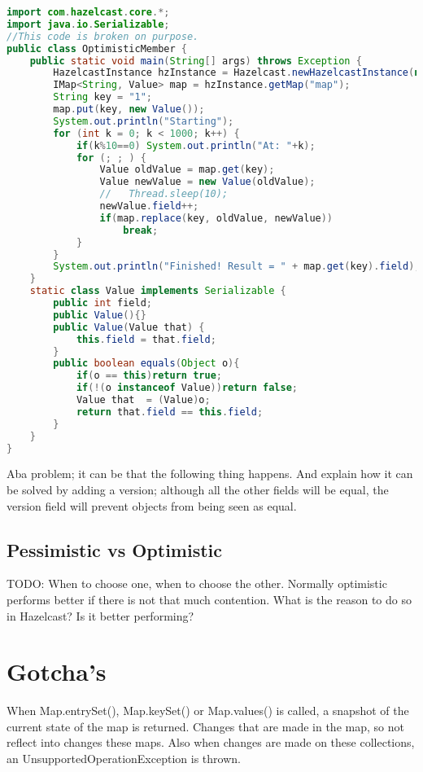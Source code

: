 \begin{lstlisting}[language=java]
import com.hazelcast.core.*;
import java.io.Serializable;
//This code is broken on purpose.
public class OptimisticMember {
    public static void main(String[] args) throws Exception {
        HazelcastInstance hzInstance = Hazelcast.newHazelcastInstance(null);
        IMap<String, Value> map = hzInstance.getMap("map");
        String key = "1";
        map.put(key, new Value());
        System.out.println("Starting");
        for (int k = 0; k < 1000; k++) {
            if(k%10==0) System.out.println("At: "+k);
            for (; ; ) {
                Value oldValue = map.get(key);
                Value newValue = new Value(oldValue);
                //   Thread.sleep(10);
                newValue.field++;
                if(map.replace(key, oldValue, newValue))
                    break;
            }
        }
        System.out.println("Finished! Result = " + map.get(key).field);
    }
    static class Value implements Serializable {
        public int field;
        public Value(){}
        public Value(Value that) {
            this.field = that.field;
        }
        public boolean equals(Object o){
            if(o == this)return true;
            if(!(o instanceof Value))return false;
            Value that  = (Value)o;
            return that.field == this.field;
        }
    }
}
\end{lstlisting}
Aba problem; it can be that the following thing happens. And explain how it can be solved by adding a version; although all the other fields will be equal, the version field will prevent objects from being seen as equal.

\subsection{Pessimistic vs Optimistic}
TODO: When to choose one, when to choose the other. Normally optimistic performs better if there is not that much contention. What is the reason to do so in Hazelcast? Is it better performing?

\section{Gotcha's}
When Map.entrySet(), Map.keySet() or Map.values() is called, a snapshot of the current state of the map is returned. Changes that are made in the map, so not reflect into changes these maps. Also when changes are made on these collections, an UnsupportedOperationException is thrown.

